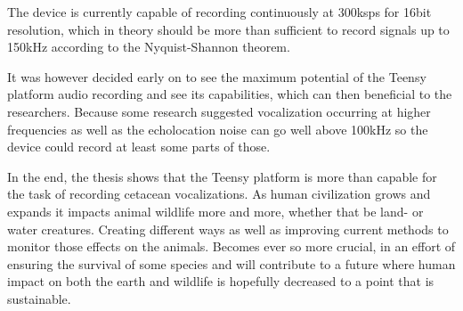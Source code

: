 The device is currently capable of recording continuously at 300ksps for 16bit resolution, which in theory should be more than sufficient to record signals up to 150kHz according to the Nyquist-Shannon theorem.

It was however decided early on to see the maximum potential of the Teensy platform audio recording and see its capabilities, which can then beneficial to the researchers.
Because some research suggested vocalization occurring at higher frequencies as well as the echolocation noise can go well above 100kHz so the device could record at least some parts of those.

In the end, the thesis shows that the Teensy platform is more than capable for the task of recording cetacean vocalizations.
As human civilization grows and expands it impacts animal wildlife more and more, whether that be land- or water creatures.
Creating different ways as well as improving current methods to monitor those effects on the animals.
Becomes ever so more crucial, in an effort of ensuring the survival of some species and will contribute to a future where human impact on both the earth and wildlife is hopefully decreased to a point that is sustainable.

